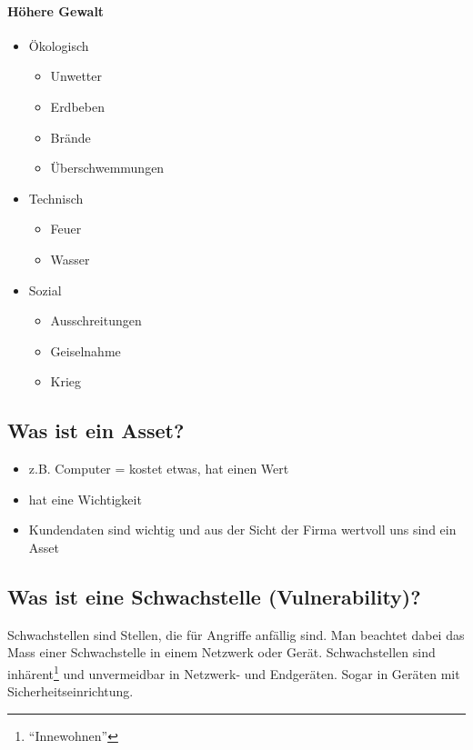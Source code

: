 \paragraph*{Höhere Gewalt}
\begin{itemize}
    \item Ökologisch
    \begin{itemize}
        \item Unwetter
        \item Erdbeben
        \item Brände
        \item Überschwemmungen
    \end{itemize}
    \item Technisch
    \begin{itemize}
        \item Feuer
        \item Wasser
    \end{itemize}
    \item Sozial
    \begin{itemize}
        \item Ausschreitungen
        \item Geiselnahme
        \item Krieg
    \end{itemize}
\end{itemize}

\subsection*{Was ist ein Asset?}
\begin{itemize}
    \item z.B. Computer = kostet etwas, hat einen Wert
    \item hat eine Wichtigkeit
    \item Kundendaten sind wichtig und aus der Sicht der Firma wertvoll uns sind ein Asset
\end{itemize}

\subsection*{Was ist eine Schwachstelle (Vulnerability)?}
Schwachstellen sind Stellen, die für Angriffe anfällig sind. Man beachtet dabei das Mass einer Schwachstelle in einem Netzwerk oder Gerät. Schwachstellen sind inhärent\footnote{"`Innewohnen"'} und unvermeidbar in Netzwerk- und Endgeräten. Sogar in Geräten mit Sicherheitseinrichtung.

